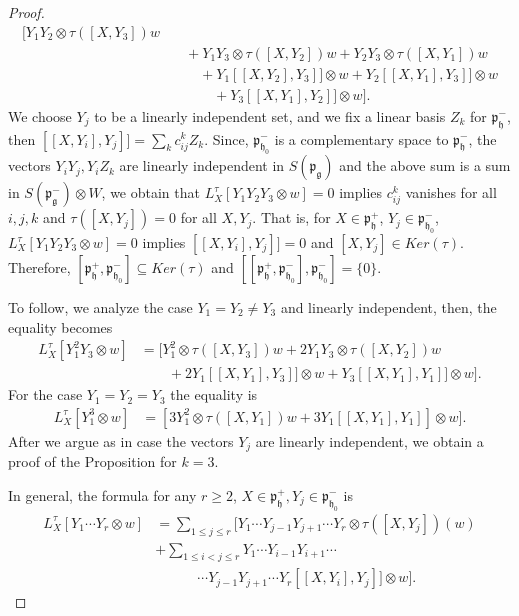 \documentclass[12pt]{amsart}
\theoremstyle{definition}
\theoremstyle{remark}
\newcommand{\g}{\mathfrak{g}}
\newcommand{\h}{\mathfrak{h}}
\newcommand{\p}{\mathfrak p}
\numberwithin{equation}{section}
\begin{document}
\begin{proof}
\begin{equation}
\begin{split}
[ Y_1Y_2 \otimes \tau([X,Y_3]) w   \\ & \quad +Y_1Y_3\otimes \tau([X,Y_2]) w+ Y_2Y_3 \otimes \tau([X,Y_1])   w
 \\ & \quad \quad +Y_1 [[X,Y_2],Y_3]]  \otimes  w+Y_2 [[X,Y_1],Y_3]] \otimes w
 \\ & \quad \quad \quad + Y_3 [[X,Y_1],Y_2]] \otimes w ].
 \end{split}
\end{equation}
We choose $Y_j$ to be a linearly independent set, and  we fix a linear basis $Z_k$ for $\p_\h^-$, then $[[X,Y_i],Y_j]]=\sum_k c_{ij}^k  Z_k $. Since, $\p_{\h_0}^-$ is a complementary
space to $\p_\h^-$, the vectors $Y_iY_j, Y_i Z_k$ are linearly independent in $S(\p_\g)$ and the above sum is a sum in $S(\p_\g^-)\otimes W$, we obtain that $L_X^\tau[Y_1Y_2Y_3\otimes w]=0$ implies $c_{ij}^k$ vanishes for all $i,j,k$ and $\tau([X,Y_j])=0$ for all $X,Y_j$. That is, for $X \in \p_\h^+$, $Y_j \in \p_{\h_0}^-$, $L_X^\tau[Y_1Y_2Y_3\otimes w] =0$ implies $[[X,Y_i],Y_j]]=0$ and $[X,Y_j] \in Ker(\tau)$. Therefore, $[\p_\h^+, \p_{\h_0}^-]\subseteq Ker(\tau)$ and $[[\p_\h^+, \p_{\h_0}^-], \p_{\h_0}^-]=\{0\}$.

 To follow,   we analyze the case $Y_1=Y_2 \not= Y_3$ and linearly independent, then,  the equality becomes
\begin{equation*} \begin{split} L_X^\tau[Y_1^2Y_3\otimes w]& =
[ Y_1^2 \otimes \tau([X,Y_3]) w     +2Y_1Y_3\otimes \tau([X,Y_2]) w
 \\ & \quad \quad +2Y_1 [[X,Y_1],Y_3]]  \otimes  w+ Y_3 [[X,Y_1],Y_1]] \otimes w ].
 \end{split}
\end{equation*}
For the case $Y_1=Y_2=Y_3$ the equality is
\begin{equation*} \begin{split} L_X^\tau[Y_1^3\otimes w]& =
[ 3Y_1^2 \otimes \tau([X,Y_1]) w      +3Y_1 [[X,Y_1],Y_1]]  \otimes  w  ].
 \end{split}
\end{equation*}
After we argue as in case the vectors $Y_j$ are linearly independent,  we obtain a proof of  the Proposition for $k=3$.

In general, the formula for any $r\geq 2$, $X \in \p_\h^+, Y_j \in \p_{\h_0}^-    $ is
\begin{equation*} \begin{split} L_X^\tau[Y_1\cdots Y_r\otimes w]& =\sum_{1\leq j \leq r} [ Y_1 \cdots Y_{j-1} Y_{j+1}\cdots Y_r \otimes \tau([X,Y_j])(w)
 \\ &  +\sum_{1 \leq i<j \leq r} Y_1 \cdots Y_{i-1} Y_{i+1}\cdots \\ & \quad \quad \quad \cdots Y_{j-1}Y_{j+1}\cdots Y_r [[X,Y_i],Y_j]]   \otimes  w  ].
 \end{split}
\end{equation*}



\end{proof}
\end{document}
